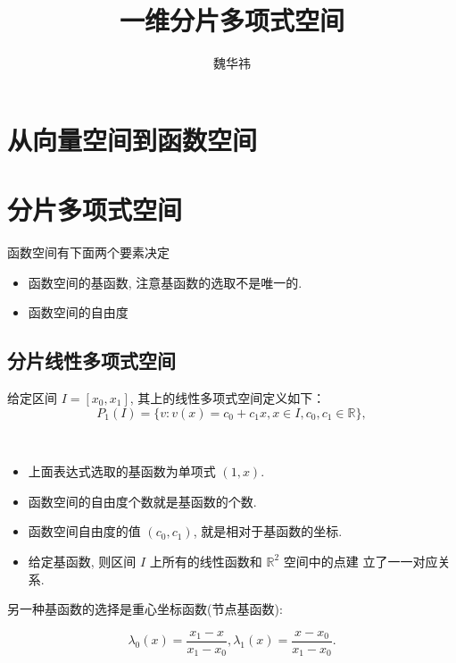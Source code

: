 \documentclass{article}
\begin{document}
\title{一维分片多项式空间}
\author{魏华祎}
\date{\chntoday}
\maketitle

\section{从向量空间到函数空间}
\section{分片多项式空间}

函数空间有下面两个要素决定
\begin{itemize}
    \item 函数空间的基函数, 注意基函数的选取不是唯一的.
    \item 函数空间的自由度
\end{itemize}

\subsection{分片线性多项式空间}
给定区间 $I = [x_0, x_1]$, 其上的线性多项式空间定义如下：
\begin{equation}
    P_1(I) = \{v: v(x) = c_0 + c_1 x, x\in I, c_0, c_1 \in \mathbb R\},
\end{equation}

\begin{framed}
\begin{remark}
~\\
\begin{itemize}
    \item 上面表达式选取的基函数为单项式 $(1, x)$.
    \item 函数空间的自由度个数就是基函数的个数.
    \item 函数空间自由度的值 $(c_0, c_1)$, 就是相对于基函数的坐标.
    \item 给定基函数, 则区间 $I$ 上所有的线性函数和 $\mathbb R^2$ 空间中的点建
        立了一一对应关系.
\end{itemize}
\end{remark}
\end{framed}

另一种基函数的选择是重心坐标函数(节点基函数):

\begin{equation}
    \lambda_0(x) = \frac{x_1 - x}{x_1 - x_0}, \lambda_1(x) = \frac{x - x_0}{x_1
    - x_0}.
\end{equation}
\end{document}
